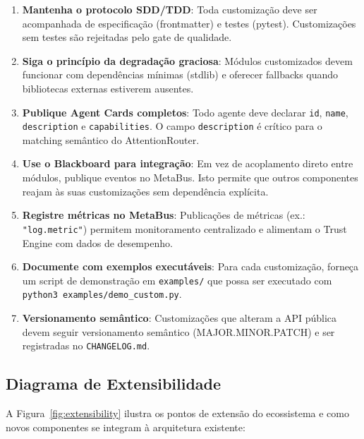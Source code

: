 \begin{enumerate}
  \item \textbf{Mantenha o protocolo SDD/TDD}: Toda customização deve ser acompanhada de especificação (frontmatter) e testes (pytest). Customizações sem testes são rejeitadas pelo gate de qualidade.
  
  \item \textbf{Siga o princípio da degradação graciosa}: Módulos customizados devem funcionar com dependências mínimas (stdlib) e oferecer fallbacks quando bibliotecas externas estiverem ausentes.
  
  \item \textbf{Publique Agent Cards completos}: Todo agente deve declarar \texttt{id}, \texttt{name}, \texttt{description} e \texttt{capabilities}. O campo \texttt{description} é crítico para o matching semântico do AttentionRouter.
  
  \item \textbf{Use o Blackboard para integração}: Em vez de acoplamento direto entre módulos, publique eventos no MetaBus. Isto permite que outros componentes reajam às suas customizações sem dependência explícita.
  
  \item \textbf{Registre métricas no MetaBus}: Publicações de métricas (ex.: \texttt{"log.metric"}) permitem monitoramento centralizado e alimentam o Trust Engine com dados de desempenho.
  
  \item \textbf{Documente com exemplos executáveis}: Para cada customização, forneça um script de demonstração em \texttt{examples/} que possa ser executado com \texttt{python3 examples/demo\_custom.py}.
  
  \item \textbf{Versionamento semântico}: Customizações que alteram a API pública devem seguir versionamento semântico (MAJOR.MINOR.PATCH) e ser registradas no \texttt{CHANGELOG.md}.
\end{enumerate}

\subsection{Diagrama de Extensibilidade}
\label{sec:diagrama-extensibilidade}

A Figura~\ref{fig:extensibility} ilustra os pontos de extensão do ecossistema e como novos componentes se integram à arquitetura existente:

